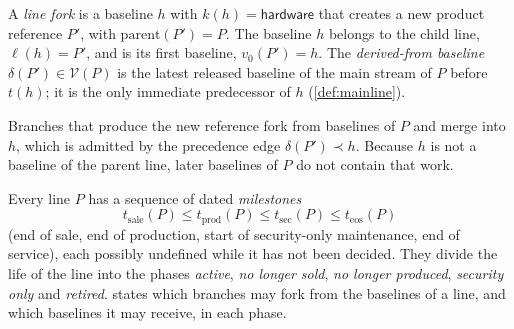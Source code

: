 \begin{definition}
  \label{def:linefork}
  A \emph{line fork} is a baseline $h$ with $k(h) = \textsf{hardware}$ that
  creates a new product reference $P'$, with $\mathrm{parent}(P') = P$.
  The baseline $h$ belongs to the child line, $\ell(h) = P'$, and is its
  first baseline, $v_0(P') = h$. The \emph{derived-from baseline}
  $\delta(P') \in \mathcal{V}(P)$ is the latest released baseline of the
  main stream of $P$ before $t(h)$; it is the only immediate predecessor of
  $h$ (\cref{def:mainline}).
\end{definition}

Branches that produce the new reference fork from baselines of $P$ and
merge into $h$, which is admitted by the precedence edge
$\delta(P') \prec h$. Because $h$ is not a baseline of the parent line,
later baselines of $P$ do not contain that work.

\begin{definition}
  \label{def:lifecycle}
  Every line $P$ has a sequence of dated \emph{milestones}
  \[
    t_{\mathrm{sale}}(P) \le t_{\mathrm{prod}}(P) \le t_{\mathrm{sec}}(P)
    \le t_{\mathrm{eos}}(P)
  \]
  (end of sale, end of production, start of security-only maintenance,
  end of service), each possibly undefined while it has not been decided.
  They divide the life of the line into the phases \emph{active},
  \emph{no longer sold}, \emph{no longer produced}, \emph{security only}
  and \emph{retired}.  states which branches may fork from
  the baselines of a line, and which baselines it may receive, in each
  phase.
\end{definition}

